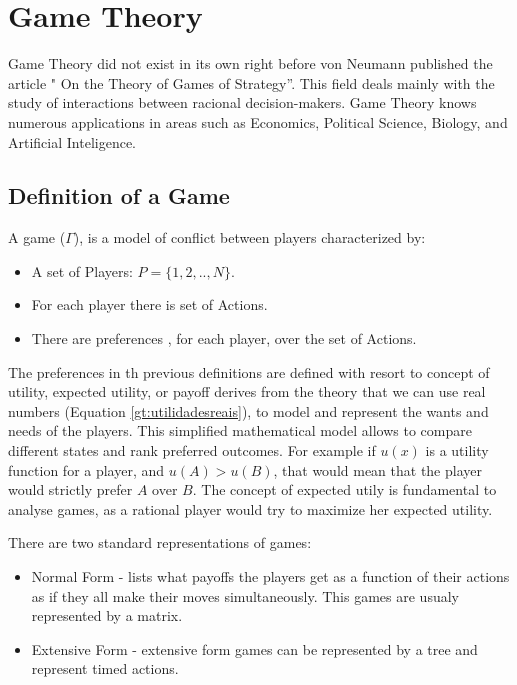 \section{Game Theory}
\label{sec:background:game_theory}

Game Theory did not exist in its own right before von Neumann published the article " On the Theory of Games of Strategy''. This field deals mainly with the study of interactions between racional decision-makers\cite{Neumann1944}. Game Theory knows numerous applications in areas such as Economics, Political Science, Biology, and Artificial Inteligence. 

\subsection{Definition of a Game}
\label{subsec:background:game_theory_definition}

A game ($\Gamma$), is a model of conflict between players characterized by\cite{Osborne2004}\cite{OsbRub94}\cite{Fra2011}:
\begin{itemize}
\item A set of Players: $P=\{1, 2, .., N \}$.
\item For each player there is set of Actions.
\item There are preferences , for each player, over the set of Actions.
\end{itemize}

The preferences in th previous definitions are defined with resort to concept of utility, expected utility, or payoff derives from the theory that we can use real numbers (Equation \ref{gt:utilidadesreais}), to model and represent the wants and needs of the players. This simplified mathematical model allows to compare different states and rank preferred outcomes. For example if $u(x)$ is a utility function for a player, and $u(A)>u(B)$, that would mean that the player would strictly prefer $A$ over $B$. The concept of expected utily is fundamental to analyse games, as a rational player would try to maximize her expected utility\cite{Neumann1944}\cite{Osborne2004}.

There are two standard representations of games:
\begin{itemize}
\item Normal Form - lists what payoffs the players get as a function of their actions as if they all make their moves simultaneously. This games are usualy represented by a matrix.
\item Extensive Form - extensive form games can be represented by a tree and represent timed actions.
\end{itemize}

